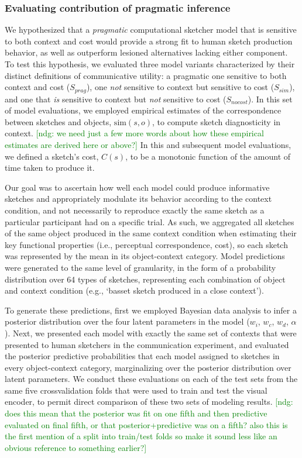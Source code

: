 \documentclass[9pt,twocolumn,twoside]{pnas-new}
\newcommand{\ndg}[1]{\textcolor{Green}{[ndg: #1]}}
\begin{document}
\subsubsection*{Evaluating contribution of pragmatic inference}

We hypothesized that a \textit{pragmatic} computational sketcher model that is sensitive to both context and cost would provide a strong fit to human sketch production behavior, as well as outperform lesioned alternatives lacking either component.
To test this hypothesis, we evaluated three model variants characterized by their distinct definitions of communicative utility: a pragmatic one sensitive to both context and cost ($S_{prag}$), one \textit{not} sensitive to context but sensitive to cost ($S_{sim}$), and one that \textit{is} sensitive to context but \textit{not} sensitive to cost ($S_{nocost}$).
In this set of model evaluations, we employed empirical estimates of the correspondence between sketches and objects, $\textrm{sim}(s,o)$, to compute sketch diagnosticity in context. 
\ndg{we need just a few more words about how these empirical estimates are derived here or above?}
In this and subsequent model evaluations, we defined a sketch's cost, $C(s)$, to be a monotonic function of the amount of time taken to produce it.

Our goal was to ascertain how well each model could produce informative sketches and appropriately modulate its behavior according to the context condition, and not necessarily to reproduce exactly the same sketch as a particular participant had on a specific trial. 
As such, we aggregated all sketches of the same object produced in the same context condition when estimating their key functional properties (i.e., perceptual correspondence, cost), so each sketch was represented by the mean in its object-context category. 
Model predictions were generated to the same level of granularity, in the form of a probability distribution over 64 types of sketches, representing each combination of object and context condition (e.g., `basset sketch produced in a close context'). 

To generate these predictions, first we employed Bayesian data analysis to infer a posterior distribution over the four latent parameters in the model ($w_{i}$, $w_{c}$, $w_{d}$, $\alpha$). 
Next, we presented each model with exactly the same set of contexts that were presented to human sketchers in the communication experiment, and evaluated the posterior predictive probabilities that each model assigned to sketches in every object-context category, marginalizing over the posterior distribution over latent parameters. 
We conduct these evaluations on each of the test sets from the same five crossvalidation folds that were used to train and test the visual encoder, to permit direct comparison of these two sets of modeling results. 
\ndg{does this mean that the posterior was fit on one fifth and then predictive evaluated on final fifth, or that posterior+predictive was on a fifth? also this is the first mention of a split into train/test folds so make it sound less like an obvious reference to something earlier?}
\end{document}
